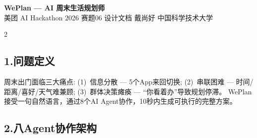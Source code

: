 \documentclass[10pt,a4paper]{ctexart}
\begin{document}
\begin{center}
{\LARGE\bfseries\color{primary} WePlan --- AI 周末生活规划师}\\[4pt]
{\small 美团 AI Hackathon 2026 \;\textbullet\; 赛题06 \;\textbullet\; 设计文档 \;\textbullet\; 戴尚好 \;\textbullet\; 中国科学技术大学}
\end{center}
\vspace{-6pt}
\noindent{\color{primary}\rule{\linewidth}{1pt}}
\vspace{2pt}

\begin{multicols}{2}

\subsection*{\color{accent}1.\;问题定义}
周末出门面临三大痛点:
(1)~信息分散 --- 5个App来回切换;
(2)~串联困难 --- 时间/距离/喜好/天气难兼顾;
(3)~群体决策瘫痪 --- ``你看着办''导致规划停滞。
WePlan 接受一句自然语言，通过8个AI Agent协作，10秒内生成可执行的完整方案。

\subsection*{\color{accent}2.\;八Agent协作架构}


\end{multicols}
\end{document}
